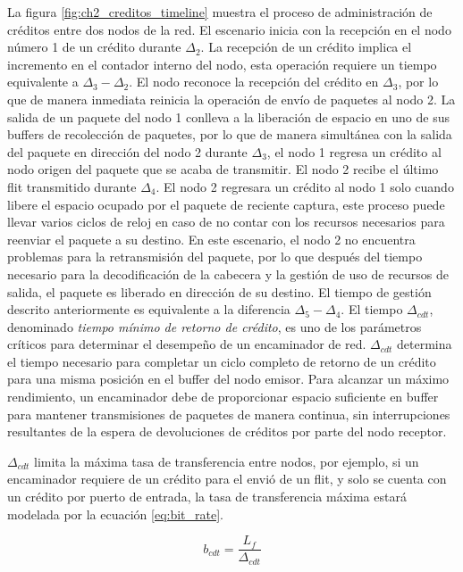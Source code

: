 La figura \ref{fig:ch2_creditos_timeline} muestra el proceso de administración de créditos entre dos nodos de la red. El escenario inicia con la recepción en el nodo número 1 de un crédito durante $\Delta_2$. La recepción de un crédito implica el incremento en el contador interno del nodo, esta operación requiere un tiempo equivalente a $\Delta_3 - \Delta_2$. El nodo reconoce la recepción del crédito en $\Delta_3$, por lo que de manera inmediata reinicia la operación de envío de paquetes al nodo 2. La salida de un paquete del nodo 1 conlleva a la liberación de espacio en uno de sus buffers de recolección de paquetes, por lo que de manera simultánea con la salida del paquete en dirección del nodo 2 durante $\Delta_3$, el nodo 1 regresa un crédito al nodo origen del paquete que se acaba de transmitir. El nodo 2 recibe el último flit transmitido durante $\Delta_4$. El nodo 2 regresara un crédito al nodo 1 solo cuando libere el espacio ocupado por el paquete de reciente captura, este proceso puede llevar varios ciclos de reloj en caso de no contar con los recursos necesarios para reenviar el paquete a su destino. En este escenario, el nodo 2 no encuentra problemas para la retransmisión del paquete, por lo que después del tiempo necesario para la decodificación de la cabecera y la gestión de uso de recursos de salida, el paquete es liberado en dirección de su destino. El tiempo de gestión descrito anteriormente es equivalente a la diferencia $\Delta_5 - \Delta_4$. El tiempo $\Delta_{cdt}$, denominado \textit{tiempo mínimo de retorno de crédito}, es uno de los parámetros críticos para determinar el desempeño de un encaminador de red. $\Delta_{cdt}$ determina el tiempo necesario para completar un ciclo completo de retorno de un crédito para una misma posición en el buffer del nodo emisor. Para alcanzar un máximo rendimiento, un encaminador debe de proporcionar espacio suficiente en buffer para mantener transmisiones de paquetes de manera continua, sin interrupciones resultantes de la espera de devoluciones de créditos por parte del nodo receptor.

$\Delta_{cdt}$ limita la máxima tasa de transferencia entre nodos, por ejemplo, si un encaminador requiere de un crédito para el envió de un flit, y solo se cuenta con un crédito por puerto de entrada, la tasa de transferencia máxima estará modelada por la ecuación \ref{eq:bit_rate}.

\begin{equation}
	b_{cdt} = \frac{L_f}{\Delta_{cdt}}
	\label{eq:bit_rate}
\end{equation}

